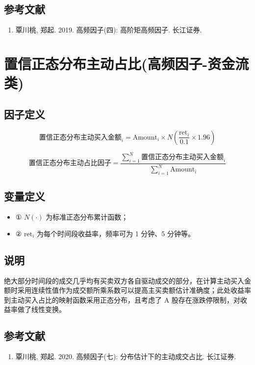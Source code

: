 \documentclass{article}
\begin{document}
\subsection{参考文献}
\begin{enumerate}
    \item 覃川桃, 郑起. 2019. 高频因子(四): 高阶矩高频因子. 长江证券.
\end{enumerate}

\section{置信正态分布主动占比(高频因子-资金流类)}

\subsection{因子定义}


\begin{equation}
    \text{置信正态分布主动买入金额}_i = \mathrm{Amount}_i \times N\left(\frac{\mathrm{ret}_i}{0.1} \times 1.96\right)
\end{equation}

\begin{equation}
    \text{置信正态分布主动占比因子} = \frac{\sum_{i=1}^{N} \text{置信正态分布主动买入金额}_i}{\sum_{i=1}^{N} \mathrm{Amount}_i}
\end{equation}

\subsection{变量定义}
\begin{itemize}
    \item ① \( N(\cdot) \) 为标准正态分布累计函数；
    \item ② \( \mathrm{ret}_i \) 为每个时间段收益率，频率可为 1 分钟、5 分钟等。
\end{itemize}

\subsection{说明}
绝大部分时间段的成交几乎均有买卖双方各自驱动成交的部分，在计算主动买入金额时采用连续性值作为成交额所乘系数可以提高主买卖额估计准确度；此处收益率到主动买入占比的映射函数采用正态分布，且考虑了 A 股存在涨跌停限制，对收益率做了线性变换。

\subsection{参考文献}
\begin{enumerate}
    \item 覃川桃, 郑起. 2020. 高频因子(七): 分布估计下的主动成交占比. 长江证券.
\end{enumerate}
\end{document}
